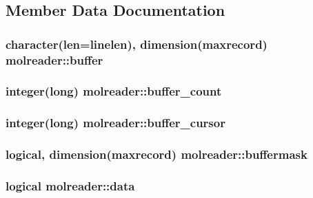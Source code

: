 \subsection{Member Data Documentation}
\hypertarget{classmolreader_a06d78b69405420664607fb01b4d8e97a}{
\subsubsection[{buffer}]{\setlength{\rightskip}{0pt plus 5cm}character(len={\bf linelen}), dimension({\bf maxrecord}) molreader\-::buffer\hspace{0.3cm}{\ttfamily [private]}}}\label{classmolreader_a06d78b69405420664607fb01b4d8e97a}
\hypertarget{classmolreader_ac7969154d301aab4a51cde89ec2f08ee}{
\subsubsection[{buffer\-\_\-count}]{\setlength{\rightskip}{0pt plus 5cm}integer(long) molreader\-::buffer\-\_\-count\hspace{0.3cm}{\ttfamily [private]}}}\label{classmolreader_ac7969154d301aab4a51cde89ec2f08ee}
\hypertarget{classmolreader_a7b2e4f11efe55d80469efa3f7aeacbab}{
\subsubsection[{buffer\-\_\-cursor}]{\setlength{\rightskip}{0pt plus 5cm}integer(long) molreader\-::buffer\-\_\-cursor\hspace{0.3cm}{\ttfamily [private]}}}\label{classmolreader_a7b2e4f11efe55d80469efa3f7aeacbab}
\hypertarget{classmolreader_a3368bfc7f2d07a7f472a8118220516a9}{
\subsubsection[{buffermask}]{\setlength{\rightskip}{0pt plus 5cm}logical, dimension({\bf maxrecord}) molreader\-::buffermask\hspace{0.3cm}{\ttfamily [private]}}}\label{classmolreader_a3368bfc7f2d07a7f472a8118220516a9}
\hypertarget{classmolreader_ad29941441961d6bb225120cc88f93db7}{
\subsubsection[{data}]{\setlength{\rightskip}{0pt plus 5cm}logical molreader\-::data\hspace{0.3cm}{\ttfamily [private]}}}\label{classmolreader_ad29941441961d6bb225120cc88f93db7}
